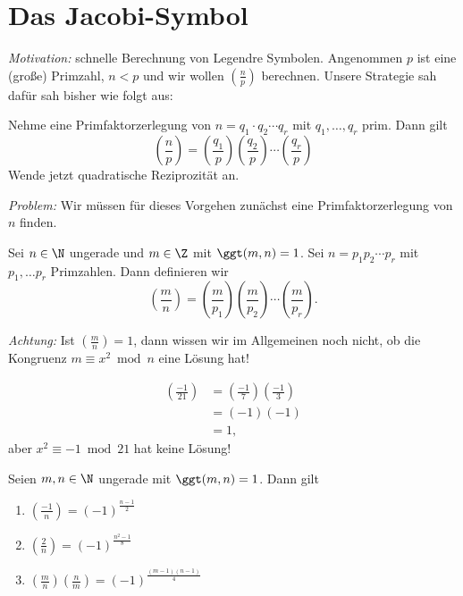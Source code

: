 \section{Das Jacobi-Symbol}

\emph{Motivation:} schnelle Berechnung von Legendre Symbolen. Angenommen $p$ ist eine (große) Primzahl, $n < p$ und wir wollen $\left(\frac{n}{p}\right)$ berechnen. Unsere Strategie sah dafür sah bisher wie folgt aus:

Nehme eine Primfaktorzerlegung von $n = q_1 \cdot q_2 \dotsm q_r$ mit $q_1,\dotsc,q_r$ prim. Dann gilt
\[ \left(\frac{n}{p}\right) = \left(\frac{q_1}{p}\right) \left(\frac{q_2}{p}\right) \dotsm \left(\frac{q_r}{p}\right) \]
Wende jetzt quadratische Reziprozität an.

\emph{Problem:} Wir müssen für dieses Vorgehen zunächst eine Primfaktorzerlegung von $n$ finden.

\begin{defn*}
	Sei $n \in \N$ ungerade und $m \in \Z$ mit $\ggt(m,n)=1$. Sei $n = p_1 p_2 \dotsm p_r$ mit $p_1,\dotsc p_r$ Primzahlen. Dann definieren wir
	\[ \left(\frac{m}{n}\right) = \left(\frac{m}{p_1}\right) \left(\frac{m}{p_2}\right) \dotsm \left(\frac{m}{p_r}\right). \]
\end{defn*}

\emph{Achtung:} Ist $\left(\frac{m}{n}\right)=1$, dann wissen wir im Allgemeinen noch nicht, ob die Kongruenz $m \equiv x^2 \bmod n$ eine Lösung hat!

\begin{exmp*}
	\begin{align*}
		\left(\frac{-1}{21}\right) &= \left(\frac{-1}{7}\right) \left(\frac{-1}{3}\right)\\
		&= (-1)(-1)\\
		&=1,
	\end{align*}
	aber $x^2 \equiv -1 \bmod 21$ hat keine Lösung!
\end{exmp*}

\begin{thm}\autolabel
	Seien $m,n \in \N$ ungerade mit $\ggt(m,n)=1$. Dann gilt
	\begin{enumerate}[label={\roman*})]
		\item $\left(\frac{-1}{n}\right) = (-1)^\frac{n-1}{2}$
		\item \( \left(\frac{2}{n}\right) = (-1)^\frac{n^2-1}{8} \)
		\item \( \left(\frac{m}{n}\right) \left(\frac{n}{m}\right) = (-1)^\frac{(m-1)(n-1)}{4} \)
	\end{enumerate}
\end{thm}